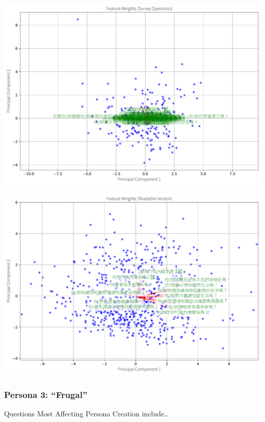 \documentclass[
  letterpaper,
  DIV=11,
  numbers=noendperiod]{scrartcl}
\begin{document}
\includegraphics{_thesis_files/figure-pdf/cell-80-output-3.pdf}

\includegraphics{_thesis_files/figure-pdf/cell-80-output-4.pdf}

\subsubsection{Persona 3: ``Frugal''}\label{persona-3-frugal}

Questions Most Affecting Persona Creation include\ldots{}
\end{document}

